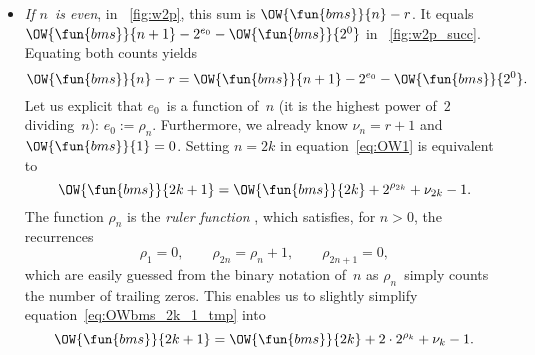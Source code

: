 \begin{itemize}

  \item \emph{If \(n\)~is even}, in \fig~\vref{fig:w2p}, this sum
  is \(\OW{\fun{bms}}{n} - r\). It
  equals \(\OW{\fun{bms}}{n+1} - 2^{e_0} - \OW{\fun{bms}}{2^0}\) in
  \fig~\vref{fig:w2p_succ}. Equating both counts yields
    \begin{equation}
      \OW{\fun{bms}}{n} - r = \OW{\fun{bms}}{n+1} - 2^{e_0} -
      \OW{\fun{bms}}{2^0}.
      \label{eq:OW1}
    \end{equation}
    Let us explicit that \(e_0\)~is a function of~\(n\) (it is the
    highest power of~\(2\) dividing~\(n\)): \(e_0 :=
    \rho_n\). Furthermore, we already know \(\nu_n = r+1\) and
    \(\OW{\fun{bms}}{1} = 0\). Setting \(n=2k\) in
    equation~\eqref{eq:OW1} is equivalent to
    \begin{equation}
      \OW{\fun{bms}}{2k+1} = \OW{\fun{bms}}{2k} + 2^{\rho_{2k}} +
      \nu_{2k} - 1.
      \label{eq:OWbms_2k_1_tmp}
    \end{equation}
    The function \(\rho_n\) is the \emph{ruler
      function} \citep{GrahamKnuthPatashnik_1994,Knuth_2011},
     which satisfies, for \(n>0\), the recurrences
    \begin{equation}
      \rho_{1} = 0,\qquad \rho_{2n} = \rho_{n} + 1,\qquad
      \rho_{2n+1} = 0,\label{eq:ruler}
    \end{equation}
    which are easily guessed from the binary notation of~\(n\) as
    \(\rho_n\)~simply counts the number of trailing zeros. This
    enables us to slightly simplify equation~\eqref{eq:OWbms_2k_1_tmp}
    into
    \begin{equation}
     \OW{\fun{bms}}{2k+1} = \OW{\fun{bms}}{2k} + 2 \cdot 2^{\rho_{k}}
     + \nu_{k} - 1.
     \label{eq:OWbms_2k_1}
    \end{equation}


\end{itemize}
